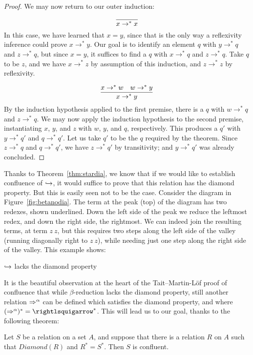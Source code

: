 \begin{proof}
  We may now return to our outer induction:

  \case{ }
  \[
  \infer{x \to^* x}{\ }
  \]
  \noindent In this case, we have learned that $x = y$, since that is the only way a reflexivity
  inference could prove $x \to^* y$.  Our goal is to identify an element $q$ with $y \to^* q$ and $z \to^* q$,
  but since $x = y$, it suffices to find a $q$ with $x \to^* q$ and $z \to^* q$.  Take $q$ to be $z$, and
  we have $x \to^* z$ by assumption of this induction, and $z \to^* z$ by reflexivity.

  \case{ }
  \[
  \infer{x \to^* y}{x \to^* w & w \to^* y}
  \]
  \noindent By the induction hypothesis applied to the first premise, there is a $q$ with
  $w \to^* q$ and $z \to^* q$.  We may now apply the induction hypothesis to the second
  premise, instantiating $x$, $y$, and $z$ with $w$, $y$, and $q$, respectively.  This
  produces a $q'$ with $y\to^* q'$ and $q\to^* q'$.  Let us take $q'$ to be the $q$ required
  by the theorem.  Since $z\to^*q$ and $q\to^* q'$, we have $z \to^* q'$ by transitivity;
  and $y\to^* q'$ was already concluded.
  

  \end{proof}

Thanks to Theorem~\ref{thm:stardia}, we know that if we would like to establish confluence of $\hookrightarrow$, it
would suffice to prove that this relation has the diamond property.  But this is easily seen
not to be the case.  Consider the diagram in Figure~\ref{fig:betanodia}.  The term at the peak (top) of the diagram
has two redexes, shown underlined.  Down the left side of the peak we reduce the leftmost redex, and down the right
side, the rightmost.  We can indeed join the resulting terms, at term $z\ z$, but this requires two steps along the
left side of the valley (running diagonally right to $z\ z$), while needing just one step along the right
side of the valley.  This example shows:

\begin{theorem}
  $\hookrightarrow$ lacks the diamond property
\end{theorem}

It is the beautiful observation at the heart of the Tait--Martin-L\"of proof of confluence that
while $\beta$-reduction lacks the diamond property, still another relation $\Rightarrow^\alpha$ can be defined which
satisfies the diamond property, and where $(\Pred^\alpha)^* = \betaa^*$.  This will lead us to our goal,
thanks to the following theorem:
\begin{theorem}
  \label{thm:tml}
  Let $S$ be a relation on a set $A$, and suppose that there is a relation $R$ on $A$ such that
  $\textit{Diamond}(R)$ and $R^* = S^*$.  Then $S$ is confluent.
\end{theorem}

